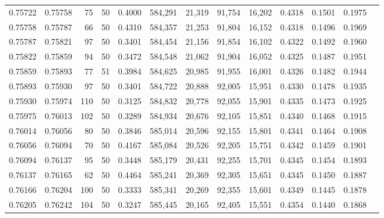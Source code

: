 \begin{tabular}{rrrrrrrrrrrrr}
0.75722 & 0.75758 &    75 &  50 &                                     0.4000 & 584,291 &  21,319 &  91,754 &  16,202 & 0.4318 & 0.1501 & 0.1975 \\
0.75758 & 0.75787 &    66 &  50 &                                     0.4310 & 584,357 &  21,253 &  91,804 &  16,152 & 0.4318 & 0.1496 & 0.1969 \\
0.75787 & 0.75821 &    97 &  50 &                                     0.3401 & 584,454 &  21,156 &  91,854 &  16,102 & 0.4322 & 0.1492 & 0.1960 \\
0.75822 & 0.75859 &    94 &  50 &                                     0.3472 & 584,548 &  21,062 &  91,904 &  16,052 & 0.4325 & 0.1487 & 0.1951 \\
0.75859 & 0.75893 &    77 &  51 &                                     0.3984 & 584,625 &  20,985 &  91,955 &  16,001 & 0.4326 & 0.1482 & 0.1944 \\
0.75893 & 0.75930 &    97 &  50 &                                     0.3401 & 584,722 &  20,888 &  92,005 &  15,951 & 0.4330 & 0.1478 & 0.1935 \\
0.75930 & 0.75974 &   110 &  50 &                                     0.3125 & 584,832 &  20,778 &  92,055 &  15,901 & 0.4335 & 0.1473 & 0.1925 \\
0.75975 & 0.76013 &   102 &  50 &                                     0.3289 & 584,934 &  20,676 &  92,105 &  15,851 & 0.4340 & 0.1468 & 0.1915 \\
0.76014 & 0.76056 &    80 &  50 &                                     0.3846 & 585,014 &  20,596 &  92,155 &  15,801 & 0.4341 & 0.1464 & 0.1908 \\
0.76056 & 0.76094 &    70 &  50 &                                     0.4167 & 585,084 &  20,526 &  92,205 &  15,751 & 0.4342 & 0.1459 & 0.1901 \\
0.76094 & 0.76137 &    95 &  50 &                                     0.3448 & 585,179 &  20,431 &  92,255 &  15,701 & 0.4345 & 0.1454 & 0.1893 \\
0.76137 & 0.76165 &    62 &  50 &                                     0.4464 & 585,241 &  20,369 &  92,305 &  15,651 & 0.4345 & 0.1450 & 0.1887 \\
0.76166 & 0.76204 &   100 &  50 &                                     0.3333 & 585,341 &  20,269 &  92,355 &  15,601 & 0.4349 & 0.1445 & 0.1878 \\
0.76205 & 0.76242 &   104 &  50 &                                     0.3247 & 585,445 &  20,165 &  92,405 &  15,551 & 0.4354 & 0.1440 & 0.1868 \\

\end{tabular}
